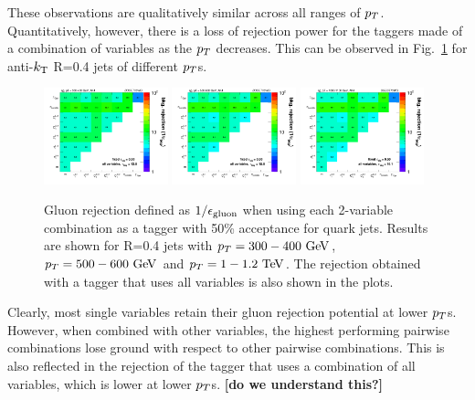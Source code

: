 These observations are qualitatively similar across all ranges of $p_T$. Quantitatively, however,
there is a loss of rejection power for the taggers made of a combination of variables as the $p_T$ decreases. 
This can be observed in Fig.~\ref{fig:qg_akt4_comb} for anti-$k_{\mathrm{T}}$ R=0.4 jets of different $p_T$s. 
\begin{figure}
\begin{center}
\includegraphics[width=0.32\textwidth]{./Figures/QGTagging/pT300/AKtR04/effBkg2D.png}
\includegraphics[width=0.32\textwidth]{./Figures/QGTagging/pT500/AKtR04/effBkg2D.png}
\includegraphics[width=0.32\textwidth]{./Figures/QGTagging/pT1000/AKtR04/effBkg2D.png}
\caption{Gluon rejection defined as $1/\epsilon_{\rm gluon}$ when using each 2-variable combination 
as a tagger with 50\% acceptance for quark jets. Results are shown for R=0.4 jets with $\pt=300-400 \GeV$, 
$\pt=500-600 \GeV$ and $\pt=1-1.2 \TeV$. The rejection obtained with a tagger that uses all variables is also shown
in the plots. }
\label{fig:qg_akt4_comb}
\end{center}
\end{figure}
Clearly, most single variables retain their gluon rejection potential at lower $p_T$s. However, when combined
with other variables, the highest performing pairwise combinations lose ground with respect to other pairwise 
combinations. This is also reflected in the rejection of the tagger that uses a combination of all variables, which
is lower at lower $p_T$s. {\bf [do we understand this?]}

